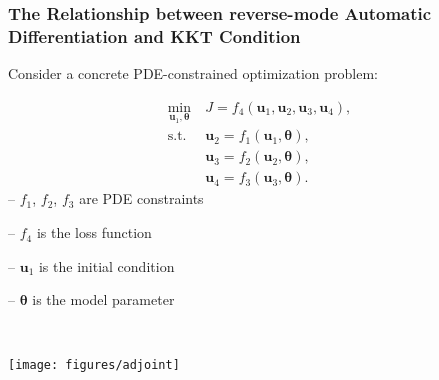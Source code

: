 \documentclass[usenames,dvipsnames]{beamer}
\newcommand{\bt}[0]{\bm{\theta}}
\newcommand{\bu}{\mathbf{u}}
\begin{document}
\begin{frame}
	\frametitle{The  Relationship between reverse-mode Automatic Differentiation and KKT Condition}
	Consider a concrete PDE-constrained optimization problem:
	
	\begin{minipage}[b]{0.45\textwidth}
		\begin{align*}
     \min_{\mathbf{u}_1, \bm{\theta}} &\  J = f_4(\mathbf{u}_1, \mathbf{u}_2, \mathbf{u}_3, \mathbf{u}_4), \\
     \mathrm{s.t.} & \ \mathbf{u}_2 = f_1(\mathbf{u}_1, \bm {\theta}), \\
     & \ \mathbf{u}_3 = f_2(\mathbf{u}_2, \bm {\theta}),\\
     & \  \mathbf{u}_4 = f_3(\mathbf{u}_3, \bm {\theta}).
\end{align*}
-- $f_1$, $f_2$, $f_3$ are PDE constraints

-- $f_4$ is the loss function

-- $\bu_1$ is the initial condition

-- $\bt$ is the model parameter
	\end{minipage}~
	\begin{minipage}[b]{0.45\textwidth}
		\texttt{[image: figures/adjoint]}
	\end{minipage}
	 
	
	
	
	\end{frame}
	
\end{document}
